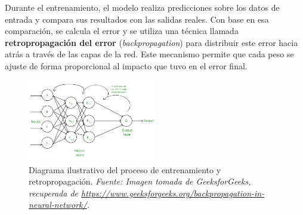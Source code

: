 \documentclass[11pt]{article} %
\begin{document}
Durante el entrenamiento, el modelo realiza predicciones sobre los datos de entrada y compara sus resultados con las salidas reales. Con base en esa comparación, se calcula el error y se utiliza una técnica llamada \textbf{retropropagación del error} (\textit{backpropagation}) para distribuir este error hacia atrás a través de las capas de la red. Este mecanismo permite que cada peso se ajuste de forma proporcional al impacto que tuvo en el error final.
\begin{figure}[H]
    \centering
    \includegraphics[width=0.5\textwidth]{Images/Frame-13.png}
    \caption{Diagrama ilustrativo del proceso de entrenamiento y retropropagación. \textit{Fuente: Imagen tomada de GeeksforGeeks, recuperada de \url{https://www.geeksforgeeks.org/backpropagation-in-neural-network/}.}}
    \label{fig:Backpropagaion}
\end{figure}

\vspace{7pt}
\end{document}
